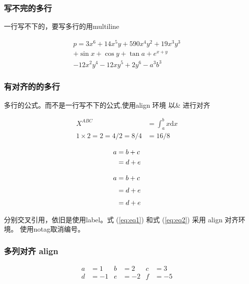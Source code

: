 \documentclass[utf-8,a4paper,11pt]{article}
\begin{document}
\subsubsection{写不完的多行}

一行写不下的，要写多行的用multiline
\begin{LTXexample}
    \begin{multline}
        p = 3x^6 + 14x^5y + 590x^4y^2 + 19x^3y^3\\
        + \sin{x} + \cos{y} + \tan{a} + e^{x+y} \\
        - 12x^2y^4 - 12xy^5 + 2y^6 - a^3b^3
    \end{multline}
\end{LTXexample}

\subsubsection{有对齐的的多行}

多行的公式。而不是一行写不下的公式,使用align 环境 以\& 进行对齐
\begin{LTXexample}
\begin{align*}
    X^{ABC}& = \int_a^b x \mathrm{d}x \\
    1\times 2=2=4/2=8/4 & =16/8
\end{align*}

\begin{align}
    a & = b + c\\
      & = d + e \notag
\end{align}
\end{LTXexample}

\begin{align}
    a & = b + c \label{eq:eq1}
    \\[3pt]
      & = d + e  \label{eq:eq2}
    \\[3pt]
      & = d + e \notag
\end{align}

分别交叉引用，依旧是使用label。式 (\ref{eq:eq1}) 和式 (\ref{eq:eq2}) 采用 align 对齐环境。 使用notag取消编号。

\subsubsection{多列对齐 align}

\begin{LTXexample}
\begin{align*} 
  a &=1 & b &=2 & c &=3 \\ 
  d &=-1 & e &=-2 & f &=-5 
\end{align*}
\end{LTXexample}
\end{document}
